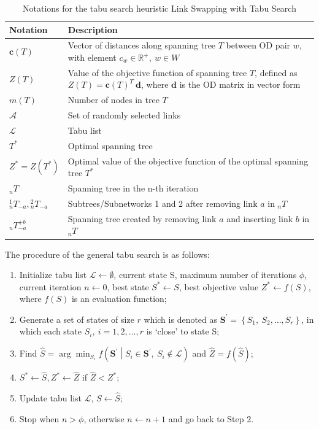 \documentclass[10pt,english]{article}
\begin{document}
\begin{table}[H]
  \centering
  \caption{Notations for the tabu search heuristic Link Swapping with Tabu Search}
    \begin{tabular}{lp{13cm}}
    \toprule
    Notation & Description \\
    \midrule
    $\boldsymbol{c}\left(T\right)$ & Vector of distances along spanning tree $T$ between OD pair $w$, with element $c_w\in\mathbb{R}^+,\ w\in W$ \\
    $Z\left(T\right)$ & Value of the objective function of spanning tree $T$, defined as $Z(T)=\boldsymbol{c}\left(T\right)^T\ \boldsymbol{d}$, where $\boldsymbol{d}$ is the OD matrix in vector form \\
    $m\left(T\right)$ & Number of nodes in tree $T$ \\
    $\mathcal{A}$ & Set of randomly selected links \\
    $\mathcal{L}$ & Tabu list \\
    $T^\ast$ & Optimal spanning tree \\
    $Z^\ast=Z\left(T^\ast\right)$ & Optimal value of the objective function of the optimal spanning tree $T^\ast$ \\
    $_nT$ & Spanning tree in the n-th iteration \\
    ${_n^1}T_{-a} ,{_n^2}T_{-a} $ & Subtrees/Subnetworks 1 and 2 after removing link $a$ in ${_n}T$ \\
    ${_n}T_{-a}^{+b}$ & Spanning tree created by removing link $a$ and inserting link $b$ in ${_n}T$ \\
    \bottomrule
    \end{tabular}%
  \label{tab:ts_notations}%
\end{table}

The procedure of the general tabu search \citet{Glover1989} is as follows:
\begin{enumerate}
  \item Initialize tabu list $\mathcal{L}\leftarrow \emptyset$, current state S, maximum number of iterations $\phi$, current iteration $n\leftarrow0$, best state $S^\ast\leftarrow S$, best objective value $Z^\ast\leftarrow f\left(S\right)$, where $f\left(S\right)$ is an evaluation function;
	\item Generate a set of states of size $r$ which is denoted as $\boldsymbol{S}^{\prime}=\left\{S_1,\ S_2,\ldots,S_r\right\}$, in which each state $S_i,\ i=1,2,\ldots,r$ is `close' to state S;
	\item Find $\hat{S}=\arg{\min_{S_i}{f\left(\boldsymbol{S}^\prime\middle| S_i\in\boldsymbol{S}^\prime,\ S_i\notin\mathcal{L}\right)}}$ and $\hat{Z}=f\left(\hat{S}\right)$;
	\item $S^\ast \leftarrow\hat{S}, Z^\ast \leftarrow\hat{Z}$ if $\hat{Z}<Z^\ast$;
	\item Update tabu list $\mathcal{L}$, $S\leftarrow\hat{S}$;
	\item Stop when $n>\phi$, otherwise $n \leftarrow n+1$ and go back to Step 2.
\end{enumerate}
\end{document}
